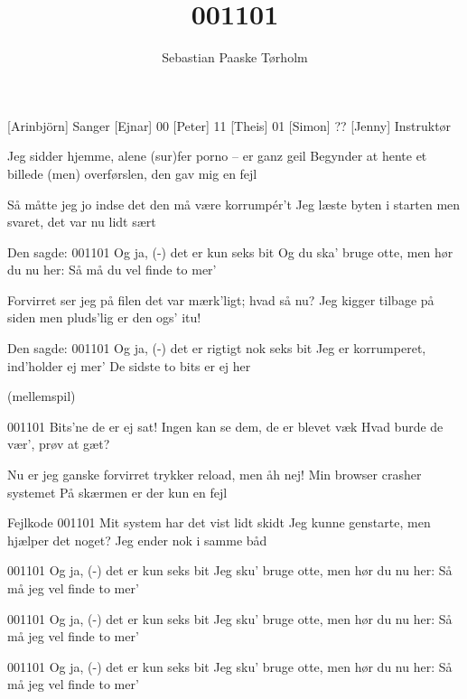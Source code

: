 \documentclass[a4paper,11pt]{article}
\title{001101}
\author{Sebastian Paaske Tørholm}
\begin{document}
\maketitle

\begin{roles}
[Arinbjörn] Sanger
[Ejnar] 00
[Peter] 11
[Theis] 01
[Simon] ??
[Jenny] Instruktør
\end{roles}

\begin{song}
%
Jeg sidder hjemme, alene
(sur)fer porno -- er ganz geil
Begynder at hente et billede
(men) overførslen, den gav mig en fejl

Så måtte jeg jo indse det
den må være korrumpér't
Jeg læste byten i starten
men svaret, det var nu lidt sært

Den sagde: 001101
Og ja, (-) det er kun seks bit
Og du ska' bruge otte, men hør du nu her:
Så må du vel finde to mer'

Forvirret ser jeg på filen
det var mærk'ligt; hvad så nu?
Jeg kigger tilbage på siden
men pluds'lig er den ogs' itu!

Den sagde: 001101
Og ja, (-) det er rigtigt nok seks bit
Jeg er korrumperet, ind'holder ej mer'
De sidste to bits er ej her

(mellemspil)

001101
Bits'ne de er ej sat!
Ingen kan se dem, de er blevet væk
Hvad burde de vær', prøv at gæt?

Nu er jeg ganske forvirret
trykker reload, men åh nej!
Min browser crasher systemet
På skærmen er der kun en fejl

Fejlkode 001101
Mit system har det vist lidt skidt
Jeg kunne genstarte, men hjælper det noget?
Jeg ender nok i samme båd

001101
Og ja, (-) det er kun seks bit
Jeg sku' bruge otte, men hør du nu her:
Så må jeg vel finde to mer'

001101
Og ja, (-) det er kun seks bit
Jeg sku' bruge otte, men hør du nu her:
Så må jeg vel finde to mer'

001101
Og ja, (-) det er kun seks bit
Jeg sku' bruge otte, men hør du nu her:
Så må jeg vel finde to mer'


\end{song}
\end{document}
